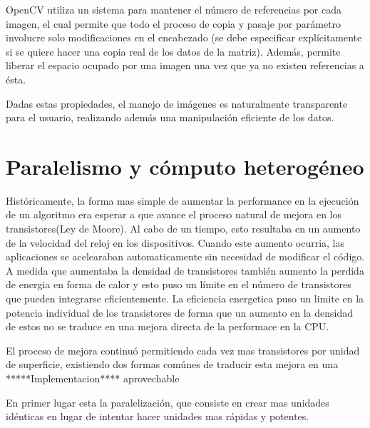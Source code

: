\documentclass[a4paper,10pt]{report}
\begin{document}
OpenCV utiliza un sistema para mantener el número de referencias por cada imagen, el cual permite que todo el proceso de copia y pasaje por parámetro involucre solo modificaciones en el encabezado (se debe especificar explícitamente si se quiere hacer una copia real de los datos de la matriz).
Además, permite liberar el espacio ocupado por una imagen una vez que ya no existen referencias a ésta.

Dadas estas propiedades, el manejo de imágenes es naturalmente transparente para el usuario, realizando además una manipulación eficiente de los datos.










\section{Paralelismo y cómputo heterogéneo}



Históricamente, la forma mas simple de aumentar la performance en la ejecución de un algoritmo era esperar a que avance el proceso natural de mejora en los transistores(Ley de Moore).
Al cabo de un tiempo, esto resultaba en un aumento de la velocidad del reloj en los dispositivos. Cuando este aumento ocurria, las aplicaciones se acelearaban automaticamente sin necesidad de modificar el código.
A medida que aumentaba la densidad de transistores también aumento la perdida de energia en forma de calor y esto puso un límite en el número de transistores que pueden integrarse eficientemente.
La eficiencia energetica puso un limite en la potencia individual de los transistores de forma que un aumento en la densidad de estos no se traduce en una mejora directa
de la performace en la CPU. 

El proceso de mejora continuó permitiendo cada vez mas transistores por unidad de superficie, existiendo dos formas comúnes de traducir esta mejora en una *****Implementacion****  aprovechable

En primer lugar esta la paralelización, que consiste en crear mas unidades idénticas en lugar de intentar hacer unidades mas rápidas y potentes.
\end{document}
